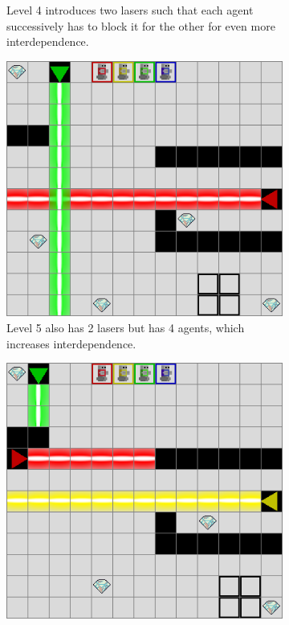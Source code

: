 \begin{figure}[h]
\begin{subfigure}[t]{0.31\linewidth}
        \caption{Level 4 introduces two lasers such that each agent successively has to block it for the other for even more interdependence.}
    \end{subfigure}
    \hfill
    \begin{subfigure}[t]{0.31\linewidth}
        \includegraphics[width=\linewidth]{images/envs/lvl5.png}
        \caption{Level 5 also has 2 lasers but has 4 agents, which increases interdependence.}
    \end{subfigure}
    \hfill
    \begin{subfigure}[t]{0.31\linewidth}
        \includegraphics[width=\linewidth]{images/envs/lvl6.png}

\end{subfigure}
\end{figure}
